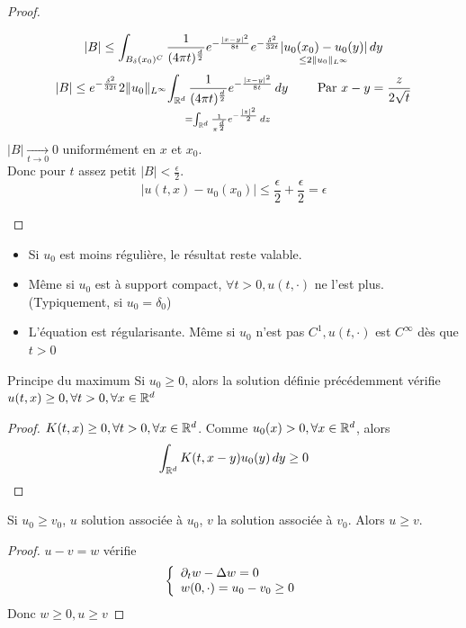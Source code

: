 \documentclass[]{report}
\begin{document}
\begin{proof}
\begin{enumerate}
            \[|B|\le \int_{B_{\delta}(x_0)^C}\frac{1}{(4\pi t)^{\frac{d}{2}}}e^{-\frac{|x-y|^2}{8t}}e^{-\frac{\delta^2}{32 t}}\underset{\le 2\lVert u_0 \rVert_{L^\infty}}{|u_0(x_0)-u_0(y)|} \, dy\]
            \[|B|\le e^{-\frac{\delta^2}{32 t}}2\lVert u_0 \rVert_{L^\infty}\underset{=\int_{\mathbb{R}^d} \frac{1}{\pi^{\frac{d}{2}}}e^{-\frac{|z|^2}{2}}\, dz}{\int_{\mathbb{R}^d}\frac{1}{(4\pi t)^{\frac{d}{2}}}e^{-\frac{|x-y|^2}{8t}}\, dy}\qquad \text{ Par $x-y=\frac{z}{2\sqrt{t}}$}\]
            $|B|\underset{t\to 0}{\longrightarrow}0$ uniformément en $x$ et $x_0$.\\
            Donc pour $t$ assez petit $|B|<\frac{\epsilon}{2}$.
            \[|u(t,x)-u_0(x_0)|\le \frac{\epsilon}{2}+\frac{\epsilon}{2}=\epsilon\]
        \end{enumerate}
    \end{proof}

    \begin{re}{}{}
        \begin{itemize}
            \item Si $u_0$ est moins régulière, le résultat reste valable.
            \item Même si $u_0$ est à support compact, $\forall t>0,u(t,\cdot)$ ne l'est plus.(Typiquement, si $u_0=\delta_0$)
            \item L'équation est régularisante. Même si $u_0$ n'est pas $C^1,u(t,\cdot)$ est $C^\infty$ dès que $t>0$
        \end{itemize}
    \end{re}

    \begin{tm}{Principe du maximum}{}
        Si $u_0\ge 0$, alors la solution définie précédemment vérifie $u(t,x)\ge 0,\forall t>0,\forall x\in \mathbb{R}^d$
    \end{tm}

    \begin{proof}
        $K(t,x)\ge 0,\forall t>0,\forall x\in \mathbb{R}^d$. Comme $u_0(x)>0,\forall x\in \mathbb{R}^d$, alors
        \[\int_{\mathbb{R}^d}K(t,x-y)u_0(y)\, dy\ge 0\]
    \end{proof}

    \begin{cor}{}{}
        Si $u_0\ge v_0$, $u$ solution associée à $u_0$, $v$ la solution associée à $v_0$. Alors $u\ge v$.
    \end{cor}

    \begin{proof}
        $u-v=w$ vérifie
        \[\left\{\begin{array}{ll} \partial_t w-\Delta w=0\\ w(0,\cdot)=u_0-v_0\ge 0 \end{array} \right.\]
        Donc $w\ge 0,u\ge v$
    \end{proof}
\end{document}
